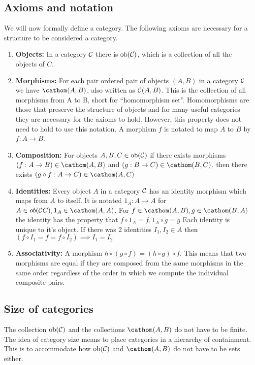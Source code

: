\documentclass[10pt,a4paper,reqno]{amsart}
\begin{document}
\subsection{Axioms and notation}
We will now formally define a category. The following axioms are necessary for a
structure to be considered a category.
\begin{enumerate}
        \item \textbf{Objects:} In a category $\mathcal{C}$ there is $\operatorname{ob}(\mathcal{C})$, which is a
        collection of all the objects of $C$.

        \item \textbf{Morphisms:} For each pair ordered pair of objects $(A,B)$
        in a category $\mathcal{C}$ we have $\cathom(A,B)$, also written as $\mathcal{C}(A,B)$.  This is
        the collection of all morphisms from A to B, short for ``homomorphism
        set''.  Homomorphisms are those that preserve the structure of objects
        and for many useful categories they are necessary for the axioms to
        hold.  However, this property does not need to hold to use this
        notation.  A morphism $f$ is notated to map $A$ to $B$ by $f: A\to B$.

        \item \textbf{Composition:} For objects $A,B,C\in \operatorname{ob}(\mathcal{C})$ if there exists
        morphisms $(f: A\to B)\in \cathom(A,B)$ and $(g: B\to C)\in \cathom(B,C)$, then
        there exists $(g\circ f: A\to C)\in \cathom(A,C)$

        \item \textbf{Identities:} Every object $A$ in a category $\mathcal{C}$ has an
        identity morphism which maps from $A$ to itself.  It is notated $1_A:
        A\to A$ for $A\in ob(\arbcat{C}C), 1_A\in \cathom(A,A)$.  For $f\in \cathom(A,B), g\in
        \cathom(B,A)$ the identity has the property that $f\circ 1_A = f, 1_A\circ g
        = g$ Each identity is unique to it's object. If there was 2 identities
        $I_1,I_2\in A$ then $(f\circ I_1 = f = f\circ I_2) \implies I_1=I_2$

        \item \textbf{Associativity:} A morphism $h\circ(g\circ f) = (h\circ
        g)\circ f$.  This means that two morphisms are equal if they are
        composed from the same morphisms in the same order regardless of the
        order in which we compute the individual composite pairs.
\end{enumerate}

\subsection{Size of categories}
The collection $\operatorname{ob}(\mathcal{C})$ and the collections $\cathom(A,B)$ do not have to be finite.
The idea of category size means to place categories in a hierarchy of
containment. This is to accommodate how $\operatorname{ob}(\mathcal{C})$ and $\cathom(A,B)$ do not have to be
sets either.
\end{document}
